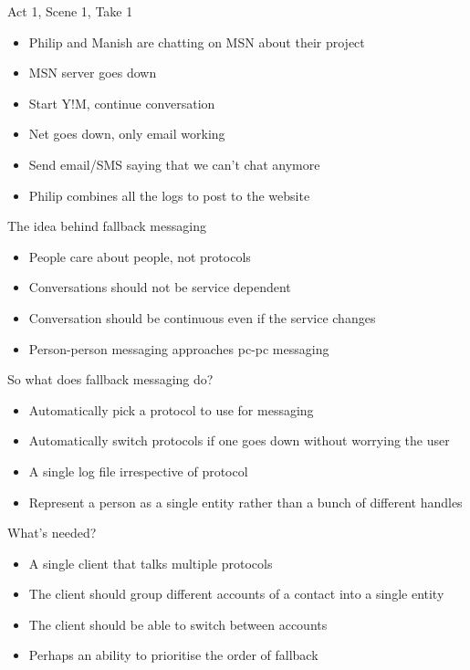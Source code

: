 \documentclass{beamer}
\begin{document}
\begin{frame}{Act 1, Scene 1, Take 1}
   \begin{itemize}
   \item<1-> Philip and Manish are chatting on MSN about their project
   \item<2-> MSN server goes down
   \item<3-> Start Y!M, continue conversation
   \item<4-> Net goes down, only email working
   \item<5-> Send email/SMS saying that we can't chat anymore
   \item<6-> Philip combines all the logs to post to the website
   \end{itemize}
\end{frame}


\begin{frame}{The idea behind fallback messaging }
   \begin{itemize}
   \item People care about people, not protocols
   \item Conversations should not be service dependent
   \item Conversation should be continuous even if the service changes
   \item Person-person messaging approaches pc-pc messaging
   \end{itemize}
\end{frame}


\begin{frame}{So what does fallback messaging do?}
   \begin{itemize}
   \item Automatically pick a protocol to use for messaging
   \item Automatically switch protocols if one goes down without worrying the user
   \item A single log file irrespective of protocol
   \item Represent a person as a single entity rather than a bunch of different handles
   \end{itemize}
\end{frame}


\begin{frame}{What's needed?}
   \begin{itemize}
   \item A single client that talks multiple protocols
   \item The client should group different accounts of a contact into a single entity
   \item The client should be able to switch between accounts
   \item Perhaps an ability to prioritise the order of fallback
   \end{itemize}
\end{frame}
\end{document}
